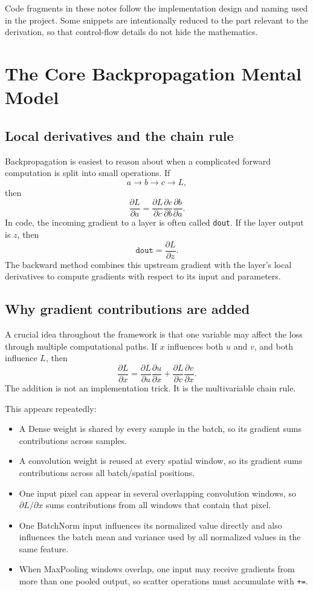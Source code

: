 \documentclass[11pt,a4paper]{article}
\newcommand{\pd}[2]{\frac{\partial #1}{\partial #2}}
\newcommand{\code}[1]{\texttt{#1}}
\begin{document}
Code fragments in these notes follow the implementation design and naming used in the project. Some snippets are intentionally reduced to the part relevant to the derivation, so that control-flow details do not hide the mathematics.

\section{The Core Backpropagation Mental Model}

\subsection{Local derivatives and the chain rule}

Backpropagation is easiest to reason about when a complicated forward computation is split into small operations. If
\[
a \longrightarrow b \longrightarrow c \longrightarrow L,
\]
then
\[
\pd{L}{a}=\pd{L}{c}\pd{c}{b}\pd{b}{a}.
\]
In code, the incoming gradient to a layer is often called \code{dout}. If the layer output is $z$, then
\[
\code{dout}=\pd{L}{z}.
\]
The backward method combines this upstream gradient with the layer's local derivatives to compute gradients with respect to its input and parameters.

\subsection{Why gradient contributions are added}

A crucial idea throughout the framework is that one variable may affect the loss through multiple computational paths. If $x$ influences both $u$ and $v$, and both influence $L$, then
\[
\pd{L}{x}
=
\pd{L}{u}\pd{u}{x}
+
\pd{L}{v}\pd{v}{x}.
\]
The addition is not an implementation trick. It is the multivariable chain rule.

This appears repeatedly:
\begin{itemize}[leftmargin=2em]
    \item A Dense weight is shared by every sample in the batch, so its gradient sums contributions across samples.
    \item A convolution weight is reused at every spatial window, so its gradient sums contributions across all batch/spatial positions.
    \item One input pixel can appear in several overlapping convolution windows, so $\partial L/\partial x$ sums contributions from all windows that contain that pixel.
    \item One BatchNorm input influences its normalized value directly and also influences the batch mean and variance used by all normalized values in the same feature.
    \item When MaxPooling windows overlap, one input may receive gradients from more than one pooled output, so scatter operations must accumulate with \code{+=}.
\end{itemize}
\end{document}
